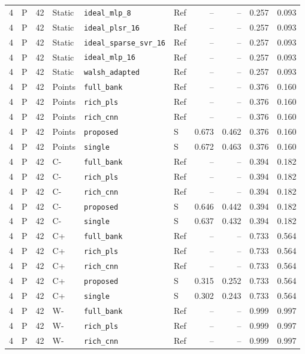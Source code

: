 \documentclass[10pt,a4paper]{article}
\begin{document}
\begin{landscape}
\begin{longtable}{rlrlllrrrr}
4 & P & 42 & Static & \texttt{ideal\_mlp\_8} & Ref & -- & -- & 0.257 & 0.093 \\
4 & P & 42 & Static & \texttt{ideal\_plsr\_16} & Ref & -- & -- & 0.257 & 0.093 \\
4 & P & 42 & Static & \texttt{ideal\_sparse\_svr\_16} & Ref & -- & -- & 0.257 & 0.093 \\
4 & P & 42 & Static & \texttt{ideal\_mlp\_16} & Ref & -- & -- & 0.257 & 0.093 \\
4 & P & 42 & Static & \texttt{walsh\_adapted} & Ref & -- & -- & 0.257 & 0.093 \\
4 & P & 42 & Points & \texttt{full\_bank} & Ref & -- & -- & 0.376 & 0.160 \\
4 & P & 42 & Points & \texttt{rich\_pls} & Ref & -- & -- & 0.376 & 0.160 \\
4 & P & 42 & Points & \texttt{rich\_cnn} & Ref & -- & -- & 0.376 & 0.160 \\
4 & P & 42 & Points & \texttt{proposed} & S & 0.673 & 0.462 & 0.376 & 0.160 \\
4 & P & 42 & Points & \texttt{single} & S & 0.672 & 0.463 & 0.376 & 0.160 \\
4 & P & 42 & C- & \texttt{full\_bank} & Ref & -- & -- & 0.394 & 0.182 \\
4 & P & 42 & C- & \texttt{rich\_pls} & Ref & -- & -- & 0.394 & 0.182 \\
4 & P & 42 & C- & \texttt{rich\_cnn} & Ref & -- & -- & 0.394 & 0.182 \\
4 & P & 42 & C- & \texttt{proposed} & S & 0.646 & 0.442 & 0.394 & 0.182 \\
4 & P & 42 & C- & \texttt{single} & S & 0.637 & 0.432 & 0.394 & 0.182 \\
4 & P & 42 & C+ & \texttt{full\_bank} & Ref & -- & -- & 0.733 & 0.564 \\
4 & P & 42 & C+ & \texttt{rich\_pls} & Ref & -- & -- & 0.733 & 0.564 \\
4 & P & 42 & C+ & \texttt{rich\_cnn} & Ref & -- & -- & 0.733 & 0.564 \\
4 & P & 42 & C+ & \texttt{proposed} & S & 0.315 & 0.252 & 0.733 & 0.564 \\
4 & P & 42 & C+ & \texttt{single} & S & 0.302 & 0.243 & 0.733 & 0.564 \\
4 & P & 42 & W- & \texttt{full\_bank} & Ref & -- & -- & 0.999 & 0.997 \\
4 & P & 42 & W- & \texttt{rich\_pls} & Ref & -- & -- & 0.999 & 0.997 \\
4 & P & 42 & W- & \texttt{rich\_cnn} & Ref & -- & -- & 0.999 & 0.997 \\

\end{longtable}
\end{landscape}
\end{document}
